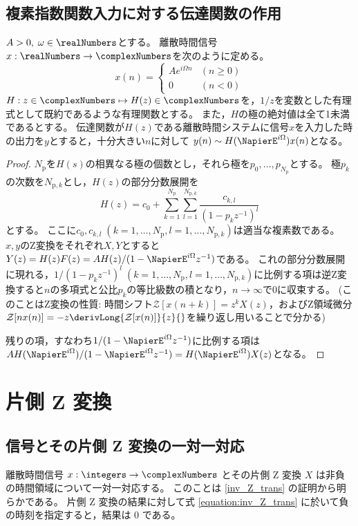		\section{複素指数関数入力に対する伝達関数の作用}
			\begin{shadebox}
				$A>0,\;\omega \in \realNumbers$とする。
				離散時間信号$x: \realNumbers \to \complexNumbers$を次のように定める。
				\[
					x(n) =
					\begin{cases}
						Ae^{i\Omega n} & (n\geq 0) \\
						0 & (n<0)
					\end{cases}
				\]
				$H: z\in\complexNumbers \mapsto H(z) \in \complexNumbers$を，$1/z$を変数とした有理式として既約であるような有理関数とする。
				また，$H$の極の絶対値は全て1未満であるとする。
				伝達関数が$H(z)$である離散時間システムに信号$x$を入力した時の出力を$y$とすると，十分大きい$n$に対して
				$y(n) \sim H(\NapierE^{i\Omega})x(n)$となる。
			\end{shadebox}
			\begin{proof}
				\quad\par
				$N_\text{p}$を$H(s)$の相異なる極の個数とし，それら極を$p_0,\dots,p_{N_\text{p}}$とする。
				極$p_k$の次数を$N_{\text{p},k}$とし，$H(z)$の部分分数展開を
				\[ H(z) = c_0 + \sum_{k=1}^{N_\mathrm{p}} \sum_{l=1}^{N_{\mathrm{p},k}} \frac{c_{k,l}}{(1-p_kz^{-1})^l} \]
				とする。
				ここに$c_0,c_{k,l}\;(k=1,\dots,N_\mathrm{p},l=1,\dots,N_{\mathrm{p},k})$は適当な複素数である。
				$x,y$のZ変換をそれぞれ$X,Y$とすると$Y(z) = H(z)F(z) = A H(z)/(1-\NapierE^{i\Omega}z^{-1})$である。
				これの部分分数展開に現れる，$1/(1-p_k z^{-1})^l\;(k=1,\dots,N_\mathrm{p},l=1,\dots,N_{\mathrm{p},k})$に比例する項は逆Z変換すると$n$の多項式と公比$p_k$の等比級数の積となり，$n\to\infty$で0に収束する。
				(このことはZ変換の性質: 時間シフト$\mathcal{Z}[x(n+k)] = z^kX(z)$，およびZ領域微分$\mathcal{Z}[nx(n)] = -z\derivLong{\mathcal{Z}[x(n)]}{z}{}$を繰り返し用いることで分かる)
				\par
				残りの項，すなわち$1/(1-\NapierE^{i\Omega}z^{-1})$に比例する項は$AH(\NapierE^{i\Omega})/(1-\NapierE^{i\Omega}z^{-1}) = H(\NapierE^{i\Omega})X(z)$となる。
			\end{proof}
	\chapter{片側 Z 変換}
		\section{信号とその片側 Z 変換の一対一対応}
			離散時間信号 $x:\integers\to\complexNumbers$ とその片側 Z 変換 $X$ は非負の時間領域について一対一対応する。
			このことは \ref{inv_Z_trans} の証明から明らかである。
			片側 Z 変換の結果に対して式 \eqref{equation:inv_Z_trans} に於いて負の時刻を指定すると，結果は 0 である。
